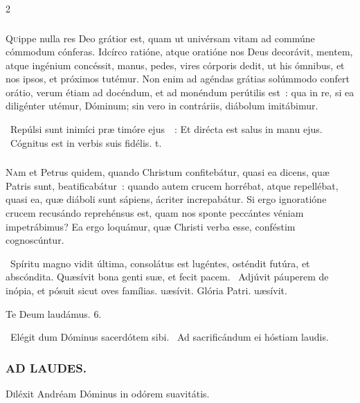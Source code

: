 \documentclass[9pt,twoside]{extarticle}
\begin{document}
\begin{multicols}{2}
{{\subsubsection*{\center {}}
\lettrine{Q}uippe nulla res Deo grátior est, quam ut univérsam vitam ad commúne cómmodum cónferas. Idcírco ratióne, atque oratióne nos Deus decorávit, mentem, atque ingénium concéssit, manus, pedes, vires córporis dedit, ut his ómnibus, et nos ipsos, et próximos tutémur. Non enim ad agéndas grátias solúmmodo confert orátio, verum étiam ad docéndum, et ad monéndum perútilis est~: qua in re, si ea diligénter utémur, Dóminum; sin vero in contráriis, diábolum imitábimur.

\begin{tightlist}{}
\item {}~Repúlsi sunt inimíci præ timóre ejus~~: \textred{*} Et dirécta est salus in manu ejus. ~Cógnitus est in verbis suis fidélis. t.
\end{tightlist}

\subsubsection*{\center {}}
\lettrine{N}am et Petrus quidem, quando Christum confitebátur, quasi ea dicens, quæ Patris sunt, beatificabátur~: quando autem crucem horrébat, atque repellébat, quasi ea, quæ diáboli sunt sápiens, ácriter increpabátur. Si ergo ignoratióne crucem recusándo reprehénsus est, quam nos sponte peccántes véniam impetrábimus? Ea ergo loquámur, quæ Christi verba esse, conféstim cognoscúntur.

\begin{tightlist}{}
\item {}~Spíritu magno vidit última, consolátus est lugéntes, osténdit futúra, et abscóndita. \textred{*} Quæsívit bona genti suæ, et fecit pacem. ~Adjúvit páuperem de inópia, et pósuit sicut oves famílias. uæsívit. Glória Patri. uæsívit.
\item Te Deum laudámus. 6.
\item {}~Elégit dum Dóminus sacerdótem sibi. ~Ad sacrificándum ei hóstiam laudis.
\end{tightlist}

\subsubsection*{\center \textsc{AD LAUDES.}}
\begin{center} \end{center}
\lettrine{D}iléxit Andréam Dóminus in odórem suavitátis.

}}
\end{multicols}
\end{document}
